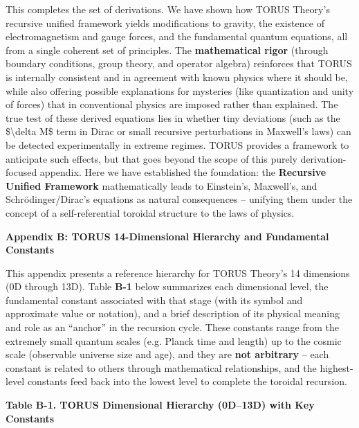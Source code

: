 \documentclass[
]{article}
\begin{document}
{This completes the set of derivations. We have shown how TORUS Theory's
recursive unified framework yields modifications to gravity, the
existence of electromagnetism and gauge forces, and the fundamental
quantum equations, all from a single coherent set of principles. The
\textbf{mathematical rigor} (through boundary conditions, group theory,
and operator algebra) reinforces that TORUS is internally consistent and
in agreement with known physics where it should be, while also offering
possible explanations for mysteries (like quantization and unity of
forces) that in conventional physics are imposed rather than explained.
The true test of these derived equations lies in whether tiny deviations
(such as the \$\textbackslash delta M\$ term in Dirac or small recursive
perturbations in Maxwell's laws) can be detected experimentally in
extreme regimes. TORUS provides a framework to anticipate such
effects\hspace{0pt}, but that goes beyond the scope of this purely
derivation-focused appendix. Here we have established the foundation:
the \textbf{Recursive Unified Framework} mathematically leads to
Einstein's, Maxwell's, and Schrödinger/Dirac's equations as natural
consequences -- unifying them under the concept of a self-referential
toroidal structure to the laws of physics.

\textbf{Appendix B: TORUS 14-Dimensional Hierarchy and Fundamental
Constants}

This appendix presents a reference hierarchy for TORUS Theory's 14
dimensions (0D through 13D). Table \textbf{B-1} below summarizes each
dimensional level, the fundamental constant associated with that stage
(with its symbol and approximate value or notation), and a brief
description of its physical meaning and role as an ``anchor'' in the
recursion cycle. These constants range from the extremely small quantum
scales (e.g. Planck time and length) up to the cosmic scale (observable
universe size and age), and they are \textbf{not arbitrary} -- each
constant is related to others through mathematical relationships, and
the highest-level constants feed back into the lowest level to complete
the toroidal recursion\hspace{0pt}.

\textbf{Table B-1. TORUS Dimensional Hierarchy (0D--13D) with Key
Constants}\hspace{0pt}

}
\end{document}
